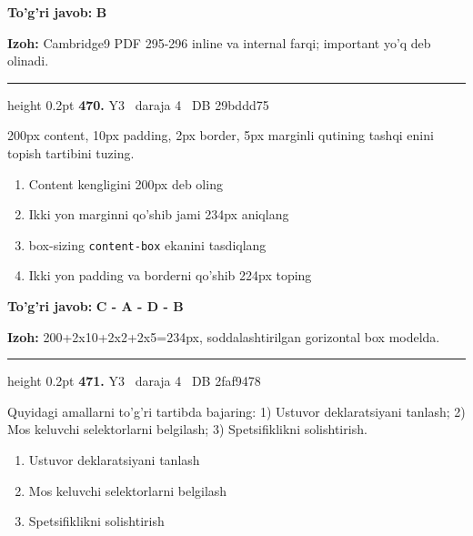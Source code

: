 \documentclass[10pt,a4paper,oneside]{article}
\begin{document}
\begin{tcolorbox}[enhanced,breakable,colback=teal!4,colframe=teal!45!black,boxrule=0.45pt,arc=1.2mm,left=2.8mm,right=2.8mm,top=2mm,bottom=2mm,before skip=2mm,after skip=2mm]
\textbf{\color{teal}To'g'ri javob:} \textbf{B}
\par\smallskip
\textbf{Izoh:} Cambridge9 PDF 295-296 inline va internal farqi; important yo'q deb olinadi.
\end{tcolorbox}
\vspace{2mm}\hrule height 0.2pt \vspace{4mm}
\hypertarget{q470}{\textbf{\color{ink}470.}}  {\color{muted}\scriptsize Y3 \textbullet\ daraja 4 \textbullet\ DB 29bddd75}
\par
200px content, 10px padding, 2px border, 5px marginli qutining tashqi enini topish tartibini tuzing.
\begin{enumerate}[label=\Alph*),leftmargin=9mm]
\item Content kengligini 200px deb oling
\item Ikki yon marginni qo'shib jami 234px aniqlang
\item box-sizing \texttt{content-box} ekanini tasdiqlang
\item Ikki yon padding va borderni qo'shib 224px toping
\end{enumerate}
\begin{tcolorbox}[enhanced,breakable,colback=teal!4,colframe=teal!45!black,boxrule=0.45pt,arc=1.2mm,left=2.8mm,right=2.8mm,top=2mm,bottom=2mm,before skip=2mm,after skip=2mm]
\textbf{\color{teal}To'g'ri javob:} \textbf{C - A - D - B}
\par\smallskip
\textbf{Izoh:} 200+2x10+2x2+2x5=234px, soddalashtirilgan gorizontal box modelda.
\end{tcolorbox}
\vspace{2mm}\hrule height 0.2pt \vspace{4mm}
\hypertarget{q471}{\textbf{\color{ink}471.}}  {\color{muted}\scriptsize Y3 \textbullet\ daraja 4 \textbullet\ DB 2faf9478}
\par
Quyidagi amallarni to'g'ri tartibda bajaring: 1) Ustuvor deklaratsiyani tanlash; 2) Mos keluvchi selektorlarni belgilash; 3) Spetsifiklikni solishtirish.
\begin{enumerate}[label=\Alph*),leftmargin=9mm]
\item Ustuvor deklaratsiyani tanlash
\item Mos keluvchi selektorlarni belgilash
\item Spetsifiklikni solishtirish
\end{enumerate}
\end{document}

